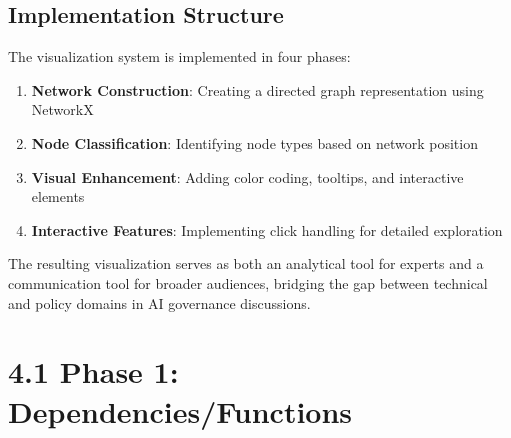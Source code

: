 \documentclass[
  11pt,
  letterpaper,
]{book}
\providecommand{\tightlist}{%
  \setlength{\itemsep}{0pt}\setlength{\parskip}{0pt}}
\begin{document}
\subsection{Implementation Structure}\label{implementation-structure}

The visualization system is implemented in four phases:

\begin{enumerate}
\def\labelenumi{\arabic{enumi}.}
\tightlist
\item
  \textbf{Network Construction}: Creating a directed graph
  representation using NetworkX
\item
  \textbf{Node Classification}: Identifying node types based on network
  position
\item
  \textbf{Visual Enhancement}: Adding color coding, tooltips, and
  interactive elements
\item
  \textbf{Interactive Features}: Implementing click handling for
  detailed exploration
\end{enumerate}

The resulting visualization serves as both an analytical tool for
experts and a communication tool for broader audiences, bridging the gap
between technical and policy domains in AI governance discussions.

\section{4.1 Phase 1:
Dependencies/Functions}\label{phase-1-dependenciesfunctions}
\end{document}
